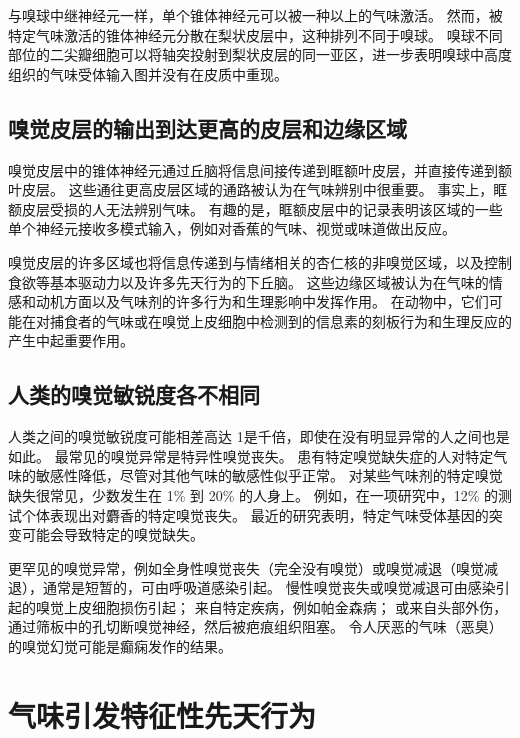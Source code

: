 与嗅球中继神经元一样，单个锥体神经元可以被一种以上的气味激活。
然而，被特定气味激活的锥体神经元分散在梨状皮层中，这种排列不同于嗅球。
嗅球不同部位的二尖瓣细胞可以将轴突投射到梨状皮层的同一亚区，进一步表明嗅球中高度组织的气味受体输入图并没有在皮质中重现。



\subsection{嗅觉皮层的输出到达更高的皮层和边缘区域}

嗅觉皮层中的锥体神经元通过丘脑将信息间接传递到眶额叶皮层，并直接传递到额叶皮层。
这些通往更高皮层区域的通路被认为在气味辨别中很重要。
事实上，眶额皮层受损的人无法辨别气味。
有趣的是，眶额皮层中的记录表明该区域的一些单个神经元接收多模式输入，例如对香蕉的气味、视觉或味道做出反应。


嗅觉皮层的许多区域也将信息传递到与情绪相关的杏仁核的非嗅觉区域，以及控制食欲等基本驱动力以及许多先天行为的下丘脑。
这些边缘区域被认为在气味的情感和动机方面以及气味剂的许多行为和生理影响中发挥作用。
在动物中，它们可能在对捕食者的气味或在嗅觉上皮细胞中检测到的信息素的刻板行为和生理反应的产生中起重要作用。



\subsection{人类的嗅觉敏锐度各不相同}

人类之间的嗅觉敏锐度可能相差高达 1是千倍，即使在没有明显异常的人之间也是如此。
最常见的嗅觉异常是特异性嗅觉丧失。
患有特定嗅觉缺失症的人对特定气味的敏感性降低，尽管对其他气味的敏感性似乎正常。
对某些气味剂的特定嗅觉缺失很常见，少数发生在 1\% 到 20\% 的人身上。
例如，在一项研究中，12\% 的测试个体表现出对麝香的特定嗅觉丧失。
最近的研究表明，特定气味受体基因的突变可能会导致特定的嗅觉缺失。


更罕见的嗅觉异常，例如全身性嗅觉丧失（完全没有嗅觉）或嗅觉减退（嗅觉减退），通常是短暂的，可由呼吸道感染引起。
慢性嗅觉丧失或嗅觉减退可由感染引起的嗅觉上皮细胞损伤引起；
来自特定疾病，例如帕金森病；
或来自头部外伤，通过筛板中的孔切断嗅觉神经，然后被疤痕组织阻塞。
令人厌恶的气味（恶臭）的嗅觉幻觉可能是癫痫发作的结果。



\section{气味引发特征性先天行为}

